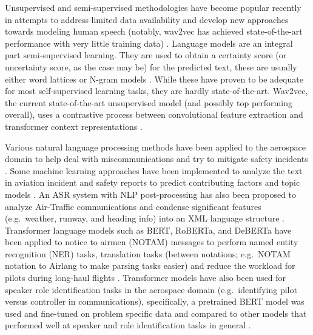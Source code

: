 \documentclass[10pt]{article}
\begin{document}
        Unsupervised and semi-supervised methodologies have become popular recently in attempts to address limited data availability
        and develop new approaches towards modeling human speech (notably, wav2vec has achieved state-of-the-art performance with
        very little training data)
        \cite{baevski_wav2vec_2020,badrinath_automatic_2022,srinivasamurthy_semi-supervised_2017,zuluaga-gomez_contextual_2021}.
        Language models are an integral part semi-supervised learning. They are used to obtain a certainty score (or uncertainty
        score, as the case may be) for the predicted text, these are usually either word lattices or N-gram models
        \cite{badrinath_automatic_2022,srinivasamurthy_semi-supervised_2017,zuluaga-gomez_contextual_2021}.
        While these have proven to be adequate for most self-supervised learning tasks, they are hardly state-of-the-art.
        Wav2vec, the current state-of-the-art unsupervised model (and possibly top performing overall), uses a contrastive process
        between convolutional feature extraction and transformer context representations \cite{baevski_wav2vec_2020}.


        Various natural language processing methods have been applied to the aerospace domain to help deal with miscommunications
        and try to mitigate safety incidents \cite{ragnarsdottir_language_2003,tanguy_natural_2016,madeira_machine_2021}.
        Some machine learning approaches have been implemented to analyze the text in aviation incident and safety reports to predict
        contributing factors and topic models \cite{tanguy_natural_2016,madeira_machine_2021}. An ASR system with NLP post-processing
        has also been proposed to analyze Air-Traffic communications and condense significant features (e.g.~weather, runway, and
        heading info) into an XML language structure \cite{ragnarsdottir_language_2003}. Transformer language models such as BERT,
        RoBERTa, and DeBERTa have been applied to notice to airmen (NOTAM) messages to perform named entity recognition (NER) tasks,
        translation tasks (between notations; e.g.~NOTAM notation to Airlang to make parsing tasks easier) and reduce the workload
        for pilots during long-haul flights \cite{arnold_knowledge_2022}. Transformer models have also been used for speaker role
        identification tasks in the aerospace domain (e.g.~identifying pilot versus controller in communications), specifically,
        a pretrained BERT model was used and fine-tuned on problem specific data and compared to other models that performed
        well at speaker and role identification tasks in general \cite{guo_comparative_2022}.
\end{document}

